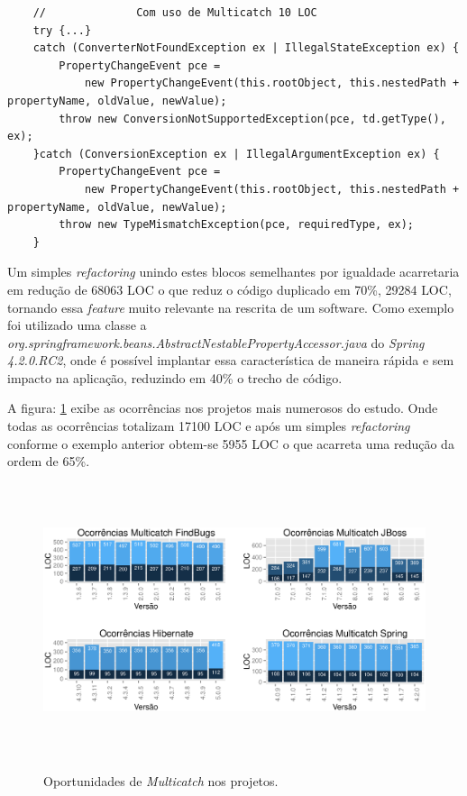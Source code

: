 \begin{lstlisting}
	//              Com uso de Multicatch 10 LOC
	try {...}
	catch (ConverterNotFoundException ex | IllegalStateException ex) {
		PropertyChangeEvent pce =
			new PropertyChangeEvent(this.rootObject, this.nestedPath + propertyName, oldValue, newValue);
		throw new ConversionNotSupportedException(pce, td.getType(), ex);
	}catch (ConversionException ex | IllegalArgumentException ex) {
		PropertyChangeEvent pce =
			new PropertyChangeEvent(this.rootObject, this.nestedPath + propertyName, oldValue, newValue);
		throw new TypeMismatchException(pce, requiredType, ex);
	}	
\end{lstlisting}

Um simples \textit{refactoring} unindo estes blocos semelhantes por igualdade acarretaria em redução de 68063 \acs{LOC} o que reduz o código duplicado em 70\%, 29284 \acs{LOC}, tornando essa \textit{feature} muito relevante na rescrita de um software. Como exemplo foi utilizado uma classe a \textit{org.springframework.beans.AbstractNestablePropertyAccessor.java} do \textit{Spring 4.2.0.RC2}, onde é possível implantar essa característica de maneira rápida e sem impacto na aplicação, reduzindo em 40\%  o trecho de código.


A figura: \ref{fig:ocorrenciasMulticatchVersoes} exibe as ocorrências nos projetos mais numerosos do estudo. Onde todas as ocorrências totalizam 17100 \acs{LOC} e após um simples \textit{refactoring} conforme o exemplo anterior obtem-se 5955 \acs{LOC} o que acarreta uma redução da ordem de 65\%.\\

\begin{figure}[h]
	\center
	\includegraphics[height=8cm, keepaspectratio]{Imagens/ocorrenciasMulticatchVersoes}
	\label{fig:ocorrenciasMulticatchVersoes}
	\caption{Oportunidades de \textit{Multicatch} nos projetos.}
\end{figure}


